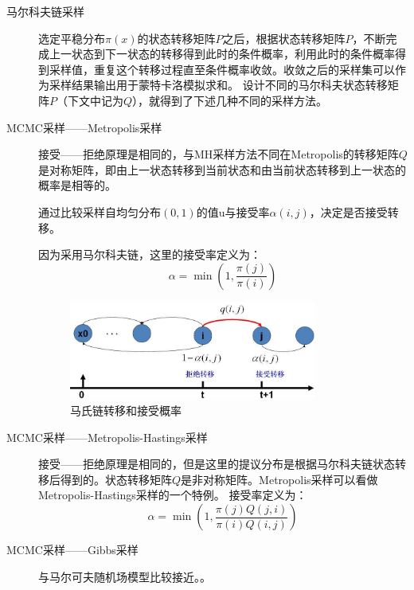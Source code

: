 \documentclass{ctexart}
\begin{document}
\begin{description}
\item[马尔科夫链采样]
选定平稳分布$\pi \left(x\right)$的状态转移矩阵$P$之后，根据状态转移矩阵$P$，不断完成上一状态到下一状态的转移得到此时的条件概率，利用此时的条件概率得到采样值，重复这个转移过程直至条件概率收敛。收敛之后的采样集可以作为采样结果输出用于蒙特卡洛模拟求和。
设计不同的马尔科夫状态转移矩阵$P$（下文中记为$Q$），就得到了下述几种不同的采样方法。

\item[MCMC采样——Metropolis采样]
接受——拒绝原理是相同的，与MH采样方法不同在Metropolis的转移矩阵$Q$是对称矩阵，即由上一状态转移到当前状态和由当前状态转移到上一状态的概率是相等的。

通过比较采样自均匀分布$\left(0,1\right)$的值u与接受率$\alpha\left(i,j\right)$，决定是否接受转移。

因为采用马尔科夫链，这里的接受率定义为：
\begin{equation}
\alpha = \min\left(1,\frac{\pi\left(j\right)}{\pi\left(i\right)}\right)
\end{equation}

\begin{figure}[H]
\begin{center}
\includegraphics[width=0.8\textwidth]{fig/mc-trans.png} %
\caption{马氏链转移和接受概率}
\end{center}
\end{figure}



\item[MCMC采样——Metropolis-Hastings采样]
接受——拒绝原理是相同的，但是这里的提议分布是根据马尔科夫链状态转移后得到的。状态转移矩阵$Q$是非对称矩阵。Metropolis采样可以看做Metropolis-Hastings采样的一个特例。
接受率定义为：
\begin{equation}
\alpha = \min\left(1,\frac{\pi\left(j\right)Q\left(j,i\right)}{\pi\left(i\right)Q\left(i,j\right)}\right)
\end{equation}


\item[MCMC采样——Gibbs采样]
与马尔可夫随机场模型比较接近。\text{\color{red}{待补充}}。


\end{description}
\end{document}
